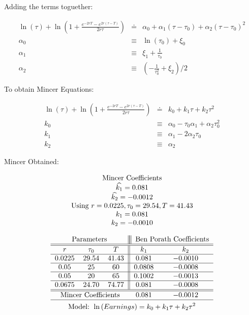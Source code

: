 \documentclass{article}
\numberwithin{equation}{section}
\begin{document}
\pagebreak

Adding the terms toguether:

\begin{eqnarray*}
\ln \left( \tau \right) +\ln \left( 1+\frac{e^{-2rT}-e^{2r(\tau -T)}}{2r\tau 
}\right) &\doteq &\alpha _{0}+\alpha _{1}\left( \tau -\tau _{0}\right)
+\alpha _{2}\left( \tau -\tau _{0}\right) ^{2} \\
\alpha _{0} &\equiv &\ln \left( \tau _{0}\right) +\xi _{0} \\
\alpha _{1} &\equiv &\xi _{1}+\frac{1}{\tau _{0}} \\
\alpha _{2} &\equiv &\left( -\frac{1}{\tau _{0}^{2}}+\xi _{2}\right) /2
\end{eqnarray*}

\pagebreak

To obtain Mincer Equations:

\begin{eqnarray*}
\ln \left( \tau \right) +\ln \left( 1+\frac{e^{-2rT}-e^{2r(\tau -T)}}{2r\tau 
}\right) &\doteq &k_{0}+k_{1}\tau +k_{2}\tau ^{2} \\
k_{0} &\equiv &\alpha _{0}-\tau _{0}\alpha _{1}+\alpha _{2}\tau _{0}^{2} \\
k_{1} &\equiv &\alpha _{1}-2\alpha _{2}\tau _{0} \\
k_{2} &\equiv &\alpha _{2}
\end{eqnarray*}

Mincer Obtained:

\begin{equation*}
\begin{tabular}{c}
Mincer Coefficients \\ 
$\widehat{k_{1}}=0.081$ \\ 
$\widehat{k_{2}}=-0.0012$ \\ 
Using $r=0.0225,\tau _{0}=29.54,T=41.43$ \\ 
$k_{1}=0.081$ \\ 
$k_{2}=-0.0010$%
\end{tabular}%
\end{equation*}

\pagebreak

\begin{gather*}
\begin{tabular}{ccc||cc}
\multicolumn{3}{c||}{Parameters} & \multicolumn{2}{||c}{Ben Porath
Coefficients} \\ \hline\hline
$r$ & $\tau _{0}$ & $T$ & $k_{1}$ & $k_{2}$ \\ \hline
$0.0225$ & $29.54$ & $41.43$ & $0.081$ & $-0.0010$ \\ \hline
$0.05$ & $25$ & $60$ & $0.0808$ & $-0.0008$ \\ \hline
$0.05$ & $20$ & $65$ & $0.1002$ & $-0.0013$ \\ \hline
$0.0675$ & $24.70$ & $74.77$ & $0.081$ & $-0.0008$ \\ \hline\hline
\multicolumn{3}{c}{Mincer Coefficients} & $0.081$ & $-0.0012$ \\ \hline
\end{tabular}
\\
\text{Model: }\ln \left( Earnings\right) =k_{0}+k_{1}\tau +k_{2}\tau ^{2}
\end{gather*}
\end{document}
